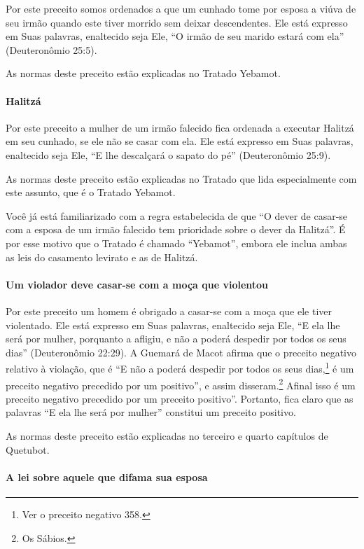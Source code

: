 Por este preceito somos ordenados a que um cunhado tome por esposa a
viúva de seu irmão quando este tiver morrido sem deixar descendentes.
Ele está expresso em Suas palavras, enaltecido seja Ele, ``O irmão de
seu marido estará com ela'' (Deuteronômio 25:5).

As normas deste preceito estão explicadas no Tratado Yebamot.

\paragraph{Halitzá}

Por este preceito a mulher de um irmão falecido fica ordenada a
executar Halitzá em seu cunhado, se ele não se casar com ela. Ele
está expresso em Suas palavras, enaltecido seja Ele, ``E lhe descalçará
o sapato do pé'' (Deuteronômio 25:9).

As normas deste preceito estão explicadas no Tratado que lida
especialmente com este assunto, que é o Tratado Yebamot.

Você já está familiarizado com a regra estabelecida de que ``O dever de
casar-se com a esposa de um irmão falecido tem prioridade sobre o dever
da Halitzá''. É por esse motivo que o Tratado é chamado ``Yebamot'',
embora ele inclua ambas as leis do casamento levirato e as de
Halitzá.

\paragraph{Um violador deve casar-se com a moça que violentou}

Por este preceito um homem é obrigado a casar-se com a moça que ele
tiver violentado. Ele está expresso em Suas palavras, enaltecido seja
Ele, ``E ela lhe será por mulher, porquanto a afligiu, e não a poderá
despedir por todos os seus dias'' (Deuteronômio 22:29). A Guemará de
Macot afirma que o preceito negativo relativo à violação, que é ``E não
a poderá despedir por todos os seus dias,\footnote{Ver o preceito negativo 358.} é um preceito negativo precedido por um positivo'', e assim
disseram.\footnote{Os Sábios.} Afinal isso é um preceito negativo
precedido por um preceito positivo''. Portanto, fica claro que as palavras ``E ela lhe será por mulher'' constitui um preceito positivo.

As normas deste preceito estão explicadas no terceiro e quarto
capítulos de Quetubot.

\paragraph{A lei sobre aquele que difama sua esposa}

